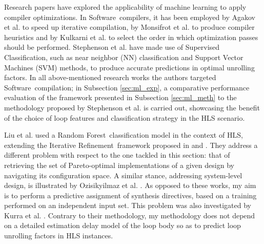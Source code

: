 \documentclass[]{usiinfthesis}
\newcommand{\SW}{{Software}}
\newcommand{\HLS}{{High Level Synthesis}}
\newcommand{\RF}{{Random Forest}}
\newcommand{\ItRef}{{Iterative Refinement}}
\begin{document}
Research papers have explored the applicability of machine learning to apply
compiler optimizations. In \SW\ compilers, it has been
employed by Agakov et al. \cite{AgakovMar06} to speed up iterative compilation,
by Monsifrot et al. \cite{MonsifrotAug02} to produce compiler heuristics
and by Kulkarni et al. \cite{KulkarniOct12} to select the order in which optimization passes
should be performed. Stephenson et al. \cite{StephensonApr05} have made use of Supervised 
Classification, such as near neighbor (NN) classification 
and Support Vector Machines (SVM) methods, to produce accurate predictions in optimal unrolling 
factors.
In all above-mentioned research works the authors targeted \SW\ 
compilation; in Subsection \ref{sec:ml_exp}, a comparative performance evaluation of the 
framework presented in Subsection \ref{sec:ml_meth} to the methodology proposed by 
Stephenson et al. is carried out, showcasing the benefit of the choice of loop features and 
classification strategy in the HLS scenario.\par

Liu et al.  \cite{LiuJun13} used a \RF\
classification model in the context of HLS, extending the \ItRef\
framework proposed in \cite{MarianiApr12} \cite{PalermoNov09}
\cite{XydisMar13} and \cite{ZuluagaJun12}. They address a different
problem with respect to the one tackled in this section: that of retrieving the set of
Pareto-optimal implementations of a given design by navigating its
configuration space. A similar stance, addressing system-level design,
is illustrated by Ozisikyilmaz et al. \cite{OzisikyilmazJun08}.  As
opposed to these works, my aim is to perform a predictive assignment
of synthesis directives, based on a training performed on an independent
input set. This problem was also investigated by Kurra et
al. \cite{KurraApr07}. Contrary to their methodology, my methodology does not
depend on a detailed estimation delay model of the loop body so as to
predict loop unrolling factors in HLS instances.
\end{document}
